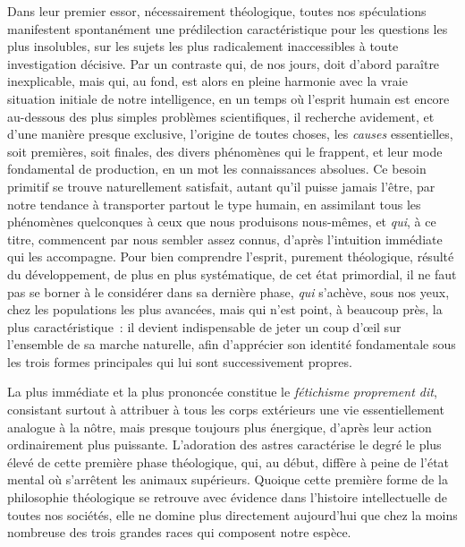 \documentclass[french,twoside]{book} %
\begin{document}
Dans leur premier essor, nécessairement théologique, toutes nos spéculations manifestent spontanément une prédilection caractéristique pour les questions les plus insolubles, sur les sujets les plus radicalement inaccessibles à toute investigation décisive. Par un contraste qui, de nos jours, doit d’abord paraître inexplicable, mais qui, au fond, est alors en pleine harmonie avec la vraie situation initiale de notre intelligence, en un temps où l’esprit humain est encore au-dessous des plus simples problèmes scientifiques, il recherche avidement, et d’une manière presque exclusive, l’origine de toutes choses, les {\itshape causes} essentielles, soit premières, soit finales, des divers phénomènes qui le frappent, et leur mode fondamental de production, en un mot les connaissances absolues. Ce besoin primitif se trouve naturellement satisfait, autant qu’il puisse jamais l’être, par notre tendance à transporter partout le type humain, en assimilant tous les phénomènes quelconques à ceux que nous produisons nous-mêmes, et {\itshape qui}, à ce titre, commencent par nous sembler assez connus, d’après l’intuition immédiate qui les accompagne. Pour bien comprendre l’esprit, purement théologique, résulté du développement, de plus en plus systématique, de cet état primordial, il ne faut pas se borner à le considérer dans sa dernière phase, {\itshape qui} s’achève, sous nos yeux, chez les populations les plus avancées, mais qui n’est point, à beaucoup près, la plus caractéristique : il devient indispensable de jeter un coup d’œil sur l’ensemble de sa marche naturelle, afin d’apprécier son identité fondamentale sous les trois formes principales qui lui sont successivement propres.\par
La plus immédiate et la plus prononcée constitue le {\itshape fétichisme proprement dit}, consistant surtout à attribuer à tous les corps extérieurs une vie essentiellement analogue à la nôtre, mais presque toujours plus énergique, d’après leur action ordinairement plus puissante. L’adoration des astres caractérise le degré le plus élevé de cette première phase théologique, qui, au début, diffère à peine de l’état mental où s’arrêtent les animaux supérieurs. Quoique cette première forme de la philosophie théologique se retrouve avec évidence dans l’histoire intellectuelle de toutes nos sociétés, elle ne domine plus directement aujourd’hui que chez la moins nombreuse des trois grandes races qui composent notre espèce.\par
\end{document}
